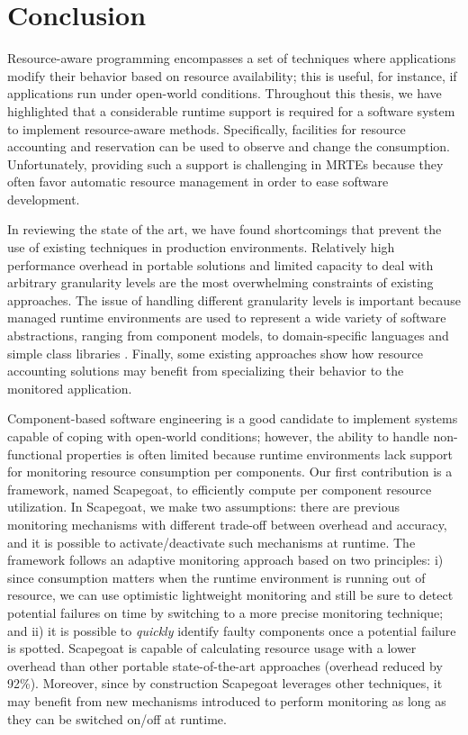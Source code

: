 \section{Conclusion} \label{sec:thesis-conclusions}

Resource-aware programming encompasses a set of techniques where applications modify their behavior based on resource availability;
this is useful, for instance, if applications run under open-world conditions.
Throughout this thesis, we have highlighted that a considerable runtime support is required for a software system to implement resource-aware methods.
Specifically, facilities for resource accounting and reservation can be used to observe and change the consumption.
Unfortunately, providing such a support is challenging in MRTEs because they often favor automatic resource management in order to ease software development.

In reviewing the state of the art, we have found shortcomings that prevent the use of existing techniques in production environments.
Relatively high performance overhead in portable solutions and limited capacity to deal with arbitrary granularity levels are the most overwhelming constraints of existing approaches.
The issue of handling different granularity levels is important because managed runtime environments are used to represent a wide variety of software abstractions, ranging from component models, to domain-specific languages and simple class libraries .
Finally, some existing approaches show how resource accounting solutions may benefit from specializing their behavior to the monitored application.

Component-based software engineering is a good candidate to implement systems capable of coping with open-world conditions; however, the ability to handle non-functional properties is often limited because runtime environments lack support for monitoring resource consumption per components.
Our first contribution is a framework, named Scapegoat, to efficiently compute per component resource utilization.
In Scapegoat, we make two assumptions: there are previous monitoring mechanisms with different trade-off between overhead and accuracy, and
it is possible to activate/deactivate such mechanisms at runtime.
The framework follows an adaptive monitoring approach based on two principles: i) since consumption matters when the runtime environment is running out
of resource, we can use optimistic lightweight monitoring and still be sure to detect potential failures on time by switching to a more precise monitoring technique; and ii) it is possible to \textit{quickly} identify faulty components once a potential failure is spotted.
Scapegoat is capable of calculating resource usage with a lower overhead than other portable state-of-the-art approaches (overhead reduced by 92\%).
Moreover, since by construction Scapegoat leverages other techniques, it may benefit from new mechanisms introduced to perform monitoring as long as they can be switched on/off at runtime.   

